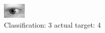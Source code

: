 \begin{figure}[h!]
\begin{center}
\includegraphics[width=0.60\columnwidth]{figures/ID760_class_3_target_4.png}
\end{center}
\caption{ Classification: 3 actual target: 4}
\label{fig:ID760_class_3_target_4}
\end{figure}
